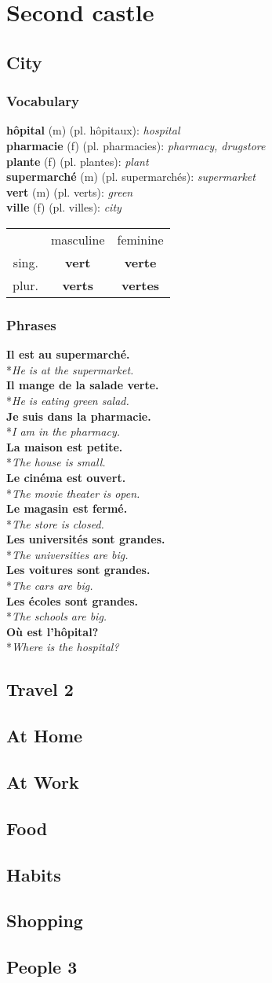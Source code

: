 \documentclass[a4paper,11pt,oneside]{book}
\newcommand{\phrase}[2]{\noindent\textbf{#1}\\*\-\hspace{0.5cm}\textit{#2}\\}
\newcommand{\noundecl}[4]{
\begin{tabular}{rcc}
 & masculine & feminine \\
 sing. & \textbf{#1} & \textbf{#2} \\
 plur. & \textbf{#3} & \textbf{#4}
\end{tabular}
}
\newcommand{\noundef}[4]{\textbf{#1} (#3) (pl. #2): \textit{#4}\\}
\newcommand{\lexicon}{\subsection{Vocabulary}}
\newcommand{\phrases}{\subsection{Phrases}}
\begin{document}
\chapter{Second castle}

\section{City}

\lexicon

\noundef{hôpital}{hôpitaux}{m}{hospital}
\noundef{pharmacie}{pharmacies}{f}{pharmacy, drugstore}
\noundef{plante}{plantes}{f}{plant}
\noundef{supermarché}{supermarchés}{m}{supermarket}
\noundef{vert}{verts}{m}{green}
\noundef{ville}{villes}{f}{city}

\noundecl{vert}{verte}{verts}{vertes}

\phrases

\phrase{Il est au supermarché.}{He is at the supermarket.}
\phrase{Il mange de la salade verte.}{He is eating green salad.}
\phrase{Je suis dans la pharmacie.}{I am in the pharmacy.}
\phrase{La maison est petite.}{The house is small.}
\phrase{Le cinéma est ouvert.}{The movie theater is open.}
\phrase{Le magasin est fermé.}{The store is closed.}
\phrase{Les universités sont grandes.}{The universities are big.}
\phrase{Les voitures sont grandes.}{The cars are big.}
\phrase{Les écoles sont grandes.}{The schools are big.}
\phrase{Où est l'hôpital?}{Where is the hospital?}

\section{Travel 2}
\section{At Home}
\section{At Work}
\section{Food}
\section{Habits}
\section{Shopping}
\section{People 3}
\end{document}
